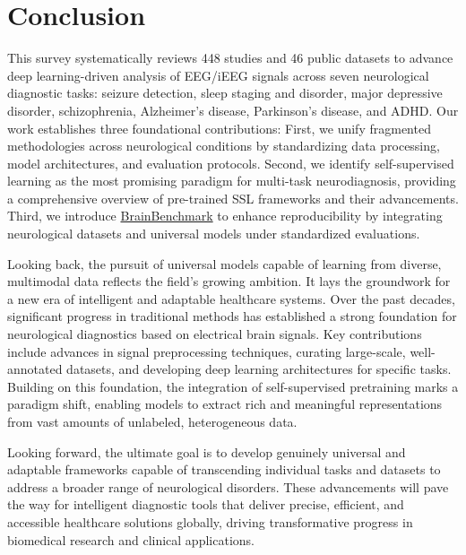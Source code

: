 \section{Conclusion}
This survey systematically reviews 448 studies and 46 public datasets to advance deep learning-driven analysis of EEG/iEEG signals across seven neurological diagnostic tasks: seizure detection, sleep staging and disorder, major depressive disorder, schizophrenia, Alzheimer’s disease, Parkinson’s disease, and ADHD.
Our work establishes three foundational contributions: First, we unify fragmented methodologies across neurological conditions by standardizing data processing, model architectures, and evaluation protocols.
Second, we identify self-supervised learning as the most promising paradigm for multi-task neurodiagnosis, providing a comprehensive overview of pre-trained SSL frameworks and their advancements. Third, we introduce \href{https://github.com/ZJU-BrainNet/BrainBenchmark}{BrainBenchmark} to enhance reproducibility by integrating neurological datasets and universal models under standardized evaluations.

Looking back, the pursuit of universal models capable of learning from diverse, multimodal data reflects the field's growing ambition. It lays the groundwork for a new era of intelligent and adaptable healthcare systems. Over the past decades, significant progress in traditional methods has established a strong foundation for neurological diagnostics based on electrical brain signals. Key contributions include advances in signal preprocessing techniques, curating large-scale, well-annotated datasets, and developing deep learning architectures for specific tasks.
Building on this foundation, the integration of self-supervised pretraining marks a paradigm shift, enabling models to extract rich and meaningful representations from vast amounts of unlabeled, heterogeneous data.

Looking forward, the ultimate goal is to develop genuinely universal and adaptable frameworks capable of transcending individual tasks and datasets to address a broader range of neurological disorders. These advancements will pave the way for intelligent diagnostic tools that deliver precise, efficient, and accessible healthcare solutions globally, driving transformative progress in biomedical research and clinical applications.